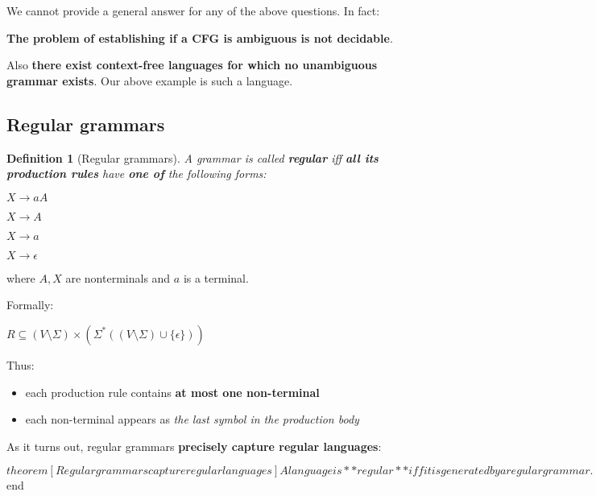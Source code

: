 \documentclass[a4paper, 12pt]{article}
\newtheorem*{theorem}{Definition}
\begin{document}
We cannot provide a general answer for any of the above questions. In fact:

\textbf{The problem of establishing if a CFG is ambiguous is not decidable}.

Also \textbf{there exist context-free languages for which no unambiguous grammar exists}. Our above example is such a language.

\subsection{ Regular grammars }

\begin{theorem}[Regular grammars]

A grammar is called \textbf{regular} iff \textbf{all its production rules} have \textbf{one of} the following forms:

\end{theorem}

$ X \rightarrow aA$

$ X \rightarrow A$

$ X \rightarrow a$

$ X \rightarrow \epsilon$

where $A,X$ are nonterminals and $a$ is a terminal.

Formally:

$ R\subseteq (V\setminus\Sigma)\times(\Sigma^*((V\setminus\Sigma)\cup\{\epsilon\}))$

Thus:
  \begin{itemize}
  	\item  each production rule contains \textbf{at most one non-terminal}
  	\item  each non-terminal appears as \textit{the last symbol in the production body}
  \end{itemize}

As it turns out, regular grammars \textbf{precisely capture regular languages}:

$theorem[Regular grammars capture regular languages]
A language is **regular** iff it is generated by a regular grammar.
$end
\end{document}
